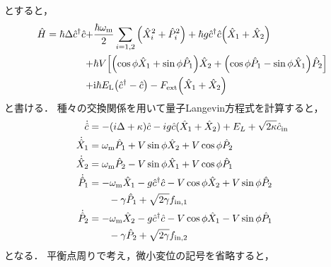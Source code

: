       とすると，
      \begin{align}
        \hat{H} = \hbar\Delta\hat{c}^{\dag}\hat{c} +& \frac{\hbar\omega_{\mathrm{m}}}{2}\sum_{i = 1, 2}\qty(\hat{X}^2_i + \hat{P}^2_i) + \hbar g\hat{c}^{\dag}\hat{c}\qty(\hat{X}_1 + \hat{X}_2) \\ 
        +& \hbar V\qty[\qty(\cos\phi \hat{X}_1 + \sin\phi \hat{P}_1)\hat{X}_2 + \qty(\cos\phi\hat{P}_1 - \sin\phi\hat{X}_1)\hat{P}_2] \\ 
        +& \mathrm{i}\hbar E_{\mathrm{L}}\qty(\hat{c}^{\dag} - \hat{c}) - F_{\mathrm{ext}}\qty(\hat{X}_1 + \hat{X}_2)
      \end{align}
      と書ける．
      種々の交換関係を用いて量子Langevin方程式を計算すると，
      \begin{align}
        \dot{\hat{c}} &= -(i\Delta + \kappa)\hat{c} - ig\hat{c}(\hat{X}_1 + \hat{X}_2) + E_L + \sqrt{2\kappa}\hat{c}_{\mathrm{in}}\\
        \dot{\hat{X}}_1 &= \omega_{\mathrm{m}}\hat{P}_1 + V \sin\phi\hat{X}_2 + V \cos\phi\hat{P}_2 \\
        \dot{\hat{X}}_2 &= \omega_{\mathrm{m}}\hat{P}_2 - V \sin\phi\hat{X}_1 + V \cos\phi\hat{P}_1 \\
        \dot{\hat{P}}_1 &= -\omega_{\mathrm{m}}\hat{X}_1 - g\hat{c}^{\dagger}\hat{c} - V \cos\phi\hat{X}_2 + V \sin\phi\hat{P}_2 \\
        &\qquad -\gamma\hat{P}_1 + \sqrt{2\gamma}f_{\mathrm{in, 1}} \\
        \dot{\hat{P}}_2 &= -\omega_{\mathrm{m}}\hat{X}_2 - g\hat{c}^{\dagger}\hat{c} - V \cos\phi\hat{X}_1 - V \sin\phi\hat{P}_1 \\
        &\qquad -\gamma\hat{P}_2 + \sqrt{2\gamma}f_{\mathrm{in, 2}}
    \end{align}
    となる．
    平衡点周りで考え，微小変位の記号を省略すると，
